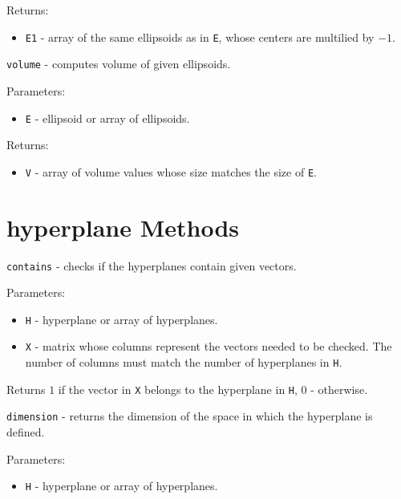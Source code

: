 \documentclass{report}
\begin{document}
Returns:
\begin{itemize}
\item {\tt E1} - array of the same ellipsoids as in {\tt E}, whose centers
are multilied by $-1$.
\end{itemize}



\newpage

{\Large {\tt volume}} - computes volume of given ellipsoids.

Parameters:
\begin{itemize}
\item {\tt E} - ellipsoid or array of ellipsoids.
\end{itemize}

Returns:
\begin{itemize}
\item {\tt V} - array of volume values whose size matches the size of {\tt E}.
\end{itemize}


\newpage

\section{hyperplane Methods}
{\Large {\tt contains}} - checks if the hyperplanes contain given vectors.

Parameters:
\begin{itemize}
\item {\tt H} - hyperplane or array of hyperplanes.
\item {\tt X} - matrix whose columns represent the vectors needed to be checked.
The number of columns must match the number of hyperplanes in {\tt H}.
\end{itemize}

Returns $1$ if the vector in {\tt X} belongs to the hyperplane in {\tt H},
$0$ - otherwise.



\newpage

{\Large {\tt dimension}} - returns the dimension of the space in which
the hyperplane is defined.

Parameters:
\begin{itemize}
\item {\tt H} - hyperplane or array of hyperplanes.
\end{itemize}
\end{document}
